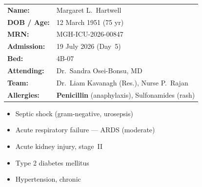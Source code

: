 \documentclass[11pt,a4paper]{scrartcl}
\begin{document}
\noindent
\begin{minipage}[t]{0.62\linewidth}
  \begin{tcolorbox}[sectionbox, title={\faUser\enspace Patient Information}]
    \begin{tabularx}{\linewidth}{@{}lX@{}}
      \textbf{Name:}       & Margaret L.\ Hartwell \\[2pt]
      \textbf{DOB / Age:}  & 12 March 1951 \quad (75 yr) \\[2pt]
      \textbf{MRN:}        & MGH-ICU-2026-00847 \\[2pt]
      \textbf{Admission:}  & 19 July 2026 \quad (Day~5) \\[2pt]
      \textbf{Bed:}        & 4B-07 \\[2pt]
      \textbf{Attending:}  & Dr.\ Sandra Osei-Bonsu, MD \\[2pt]
      \textbf{Team:}       & Dr.\ Liam Kavanagh (Res.), Nurse P.\ Rajan \\[2pt]
      \textbf{Allergies:}  & \textcolor{AlertRed}{\bfseries Penicillin} (anaphylaxis),
                             Sulfonamides (rash) \\
    \end{tabularx}
  \end{tcolorbox}
\end{minipage}%
\hfill
\begin{minipage}[t]{0.355\linewidth}
  \begin{tcolorbox}[sectionbox, title={\faClipboard\enspace Admission Diagnoses}]
    \begin{itemize}[leftmargin=10pt, itemsep=1pt, topsep=0pt]
      \item[\textcolor{MedTeal}{\faCircle[regular]}]
            \footnotesize\sffamily Septic shock (gram-negative, urosepsis)
      \item[\textcolor{MedTeal}{\faCircle[regular]}]
            \footnotesize\sffamily Acute respiratory failure — ARDS (moderate)
      \item[\textcolor{MedTeal}{\faCircle[regular]}]
            \footnotesize\sffamily Acute kidney injury, stage~II
      \item[\textcolor{MedTeal}{\faCircle[regular]}]
            \footnotesize\sffamily Type 2 diabetes mellitus
      \item[\textcolor{MedTeal}{\faCircle[regular]}]
            \footnotesize\sffamily Hypertension, chronic
    \end{itemize}
  \end{tcolorbox}
\end{minipage}
\end{document}
